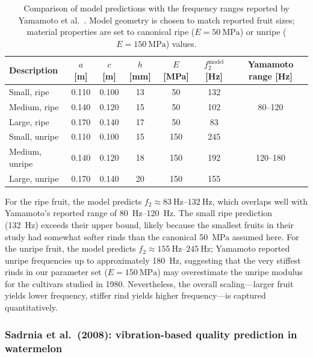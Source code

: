 \begin{table}[t]
  \centering
  \caption{Comparison of model predictions with the frequency ranges
    reported by Yamamoto et al.~\cite{Yamamoto1980}.  Model geometry is
    chosen to match reported fruit sizes; material properties are set to
    canonical ripe ($E = \SI{50}{\mega\pascal}$) or unripe
    ($E = \SI{150}{\mega\pascal}$) values.}
  \label{tab:yamamoto}
  \begin{tabular}{lcccccc}
    \toprule
    Description & $a$ [m] & $c$ [m] & $h$ [mm] & $E$ [MPa]
      & $f_2^{\mathrm{model}}$ [Hz] & Yamamoto range [Hz] \\
    \midrule
    Small, ripe     & 0.110 & 0.100 & 13 & 50  & 132 & \multirow{3}{*}{80--120} \\
    Medium, ripe    & 0.140 & 0.120 & 15 & 50  & 102 & \\
    Large, ripe     & 0.170 & 0.140 & 17 & 50  &  83 & \\[3pt]
    Small, unripe   & 0.110 & 0.100 & 15 & 150 & 245 & \multirow{3}{*}{120--180} \\
    Medium, unripe  & 0.140 & 0.120 & 18 & 150 & 192 & \\
    Large, unripe   & 0.170 & 0.140 & 20 & 150 & 155 & \\
    \bottomrule
  \end{tabular}
\end{table}

For the ripe fruit, the model predicts
$f_2 \approx \SIrange{83}{132}{\hertz}$, which overlaps well with
Yamamoto's reported range of \SIrange{80}{120}{\hertz}.  The small
ripe prediction (\SI{132}{\hertz}) exceeds their upper bound,
likely because the smallest fruits in their study had somewhat softer
rinds than the canonical \SI{50}{\mega\pascal} assumed here.
For the unripe fruit, the model predicts
$f_2 \approx \SIrange{155}{245}{\hertz}$; Yamamoto reported unripe
frequencies up to approximately \SI{180}{\hertz}, suggesting that
the very stiffest rinds in our parameter set
($E = \SI{150}{\mega\pascal}$) may overestimate the unripe modulus
for the cultivars studied in 1980.  Nevertheless, the overall
scaling---larger fruit yields lower frequency, stiffer rind yields
higher frequency---is captured quantitatively.

\subsubsection{Sadrnia et al.\ (2008): vibration-based quality prediction in watermelon}

